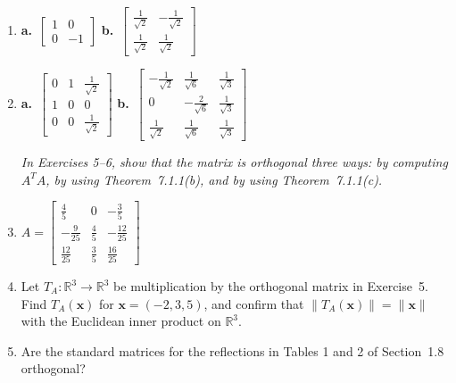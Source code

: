 \documentclass{article}
\theoremstyle{mystyle}
\begin{document}
\begin{enumerate}

\item
\textbf{a.}\ $\begin{bmatrix}1&0\\0&-1\end{bmatrix}$
\hspace{20pt}
\textbf{b.}\ $\begin{bmatrix}\tfrac{1}{\sqrt{2}}&-\tfrac{1}{\sqrt{2}}\\[4pt]\tfrac{1}{\sqrt{2}}&\tfrac{1}{\sqrt{2}}\end{bmatrix}$

\item[3.]
\textbf{a.}\ $\begin{bmatrix}0&1&\tfrac{1}{\sqrt{2}}\\[4pt]1&0&0\\[4pt]0&0&\tfrac{1}{\sqrt{2}}\end{bmatrix}$
\hspace{15pt}
\textbf{b.}\ $\begin{bmatrix}-\tfrac{1}{\sqrt{2}}&\tfrac{1}{\sqrt{6}}&\tfrac{1}{\sqrt{3}}\\[4pt]0&-\tfrac{2}{\sqrt{6}}&\tfrac{1}{\sqrt{3}}\\[4pt]\tfrac{1}{\sqrt{2}}&\tfrac{1}{\sqrt{6}}&\tfrac{1}{\sqrt{3}}\end{bmatrix}$

\noindent\textit{In Exercises 5--6, show that the matrix is orthogonal three ways:
by computing $A^TA$, by using Theorem~7.1.1(b), and by using Theorem~7.1.1(c).}

\item[5.] $A = \begin{bmatrix}\tfrac{4}{5}&0&-\tfrac{3}{5}\\[4pt]-\tfrac{9}{25}&\tfrac{4}{5}&-\tfrac{12}{25}\\[4pt]\tfrac{12}{25}&\tfrac{3}{5}&\tfrac{16}{25}\end{bmatrix}$

\item[7.] Let $T_A\colon\mathbb{R}^3\to\mathbb{R}^3$ be multiplication by the orthogonal
matrix in Exercise~5. Find $T_A(\mathbf{x})$ for $\mathbf{x}=(-2,3,5)$, and confirm
that $\|T_A(\mathbf{x})\|=\|\mathbf{x}\|$ with the Euclidean inner product on $\mathbb{R}^3$.

\item[9.] Are the standard matrices for the reflections in Tables 1 and 2 of Section~1.8
orthogonal?


\end{enumerate}
\end{document}
